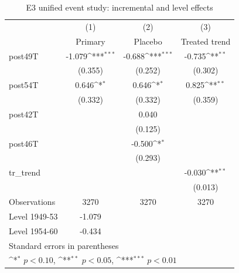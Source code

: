 \begin{table}[htbp]\centering
\def\sym#1{\ifmmode^{#1}\else\(^{#1}\)\fi}
\caption{E3 unified event study: incremental and level effects}
\begin{tabular}{l*{3}{c}}
\toprule
                    &\multicolumn{1}{c}{(1)}&\multicolumn{1}{c}{(2)}&\multicolumn{1}{c}{(3)}\\
                    &\multicolumn{1}{c}{Primary}&\multicolumn{1}{c}{Placebo}&\multicolumn{1}{c}{Treated trend}\\
\midrule
post49T             &      -1.079\sym{***}&      -0.688\sym{***}&      -0.735\sym{**} \\
                    &     (0.355)         &     (0.252)         &     (0.302)         \\
\addlinespace
post54T             &       0.646\sym{*}  &       0.646\sym{*}  &       0.825\sym{**} \\
                    &     (0.332)         &     (0.332)         &     (0.359)         \\
\addlinespace
post42T             &                     &       0.040         &                     \\
                    &                     &     (0.125)         &                     \\
\addlinespace
post46T             &                     &      -0.500\sym{*}  &                     \\
                    &                     &     (0.293)         &                     \\
\addlinespace
tr\_trend            &                     &                     &      -0.030\sym{**} \\
                    &                     &                     &     (0.013)         \\
\midrule
Observations        &        3270         &        3270         &        3270         \\
Level 1949-53       &      -1.079         &                     &                     \\
Level 1954-60       &      -0.434         &                     &                     \\
\bottomrule
\multicolumn{4}{l}{\footnotesize Standard errors in parentheses}\\
\multicolumn{4}{l}{\footnotesize \sym{*} \(p<0.10\), \sym{**} \(p<0.05\), \sym{***} \(p<0.01\)}\\
\end{tabular}
\end{table}
